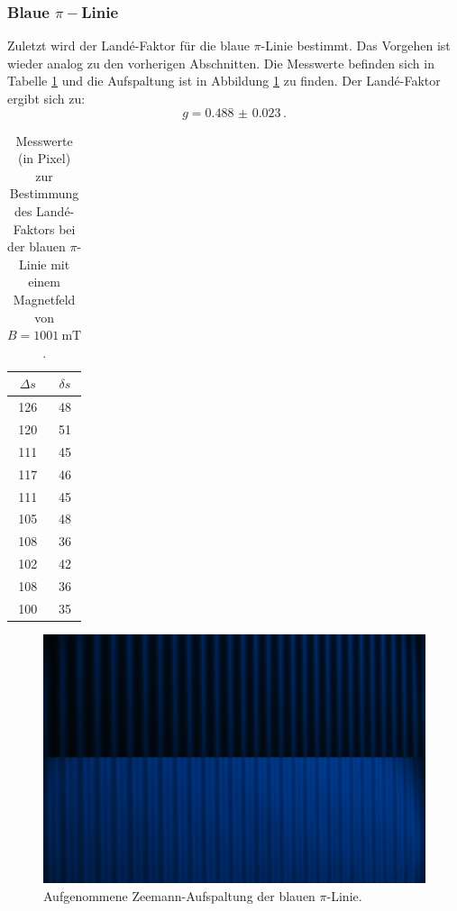 \subsubsection{Blaue \texorpdfstring{$\pi-$}ALinie}
	Zuletzt wird der Landé-Faktor für die blaue $\pi$-Linie bestimmt. Das Vorgehen ist wieder 
	analog zu den vorherigen Abschnitten.
	Die Messwerte befinden sich in Tabelle \ref{tab:blau_pi} und die Aufspaltung
	ist in Abbildung \ref{fig:blau_pi} zu finden.
	Der Landé-Faktor ergibt sich zu:
	\begin{equation*}
		g = \SI{0.488(23)} \, \text{.}
	\end{equation*}
	\begin{table}
		\centering
		\caption{Messwerte (in Pixel) zur Bestimmung des Landé-Faktors bei der blauen $\pi$-Linie mit einem Magnetfeld von $B = \SI{1001}{\milli\tesla}$.}
		\label{tab:blau_pi}
		\begin{tabular}{c | c}
			\toprule
			$\Delta s$ & $\delta s$\\
			\midrule
			126 & 48 \\
			120 & 51 \\
			111 & 45 \\
			117 & 46 \\
			111 & 45 \\
			105 & 48 \\
			108 & 36 \\
			102 & 42 \\
			108 & 36 \\
			100 & 35 \\
			\bottomrule
		\end{tabular}
	\end{table}
	\begin{figure}
	\centering
	\includegraphics[width=\textwidth]{ouurs/blau_pi_crop.png}
	\caption{Aufgenommene Zeemann-Aufspaltung der blauen $\pi$-Linie.}
	\label{fig:blau_pi}
\end{figure}

